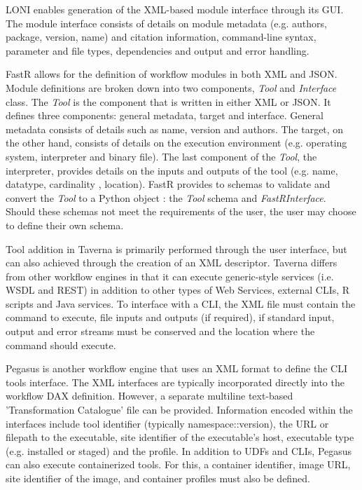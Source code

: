 \documentclass{report}
\begin{document}
            LONI enables generation of 
            the XML-based module interface through its GUI. The module interface
            consists of details on module metadata (e.g.
            authors, package, version, name) and citation information, 
            command-line syntax, parameter and file types, dependencies and 
            output and error handling.

            FastR allows for the definition of workflow modules in both XML and 
            JSON. Module definitions are broken down into two components, 
            \textit{Tool} and \textit{Interface} class. The \textit{Tool} is the
            component that is written in either XML or JSON. It defines three
            components: general metadata, target and interface. General metadata
            consists of details such as name, version and authors. The target, 
            on the other hand, consists of details on the execution environment
            (e.g. operating system, interpreter and binary file). The last 
            component of the \textit{Tool}, the interpreter, provides details on
            the inputs and outputs of the tool (e.g. name, datatype, cardinality
            , location). FastR provides to schemas to validate and convert the 
            \textit{Tool} to a Python object
            : the \textit{Tool} schema and \textit{FastRInterface}. Should these
            schemas not meet the requirements of the user, the user may choose 
            to define their own schema.

            Tool addition in Taverna is primarily performed through the user 
            interface, but can also achieved through the creation of an XML
            descriptor. Taverna differs from other workflow engines in that it
            can 
            execute generic-style services (i.e. WSDL and REST) in addition to
            other types of Web Services, external CLIs, R scripts and
            Java services. To interface with a CLI, the XML file must contain 
            the command to execute, file inputs and outputs (if required), if 
            standard input, output and error streams must be conserved and the 
            location where the command should execute.

            Pegasus is another workflow engine that uses an XML format to 
            define the CLI tools interface. The XML interfaces are typically 
            incorporated directly into the workflow DAX definition. However, a 
            separate multiline text-based 'Transformation Catalogue' file can
            be provided. Information encoded within the interfaces include
            tool identifier (typically namespace::version), the URL or filepath
            to the executable, site identifier of the executable's host, 
            executable type (e.g. installed or staged) and the profile. In
            addition to UDFs and CLIs, Pegasus
            can also execute containerized tools. For this, a container 
            identifier, image URL, site identifier of the image, and container
            profiles must also be defined.
\end{document}
